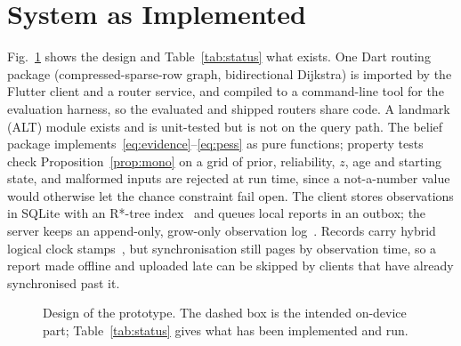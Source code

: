 \documentclass[conference]{IEEEtran}
\begin{document}
\section{System as Implemented}\label{sec:system}
Fig.~\ref{fig:arch} shows the design and Table~\ref{tab:status} what exists. One Dart routing package (compressed-sparse-row graph, bidirectional Dijkstra) is imported by the Flutter client and a router service, and compiled to a command-line tool for the evaluation harness, so the evaluated and shipped routers share code. A landmark (ALT) module exists and is unit-tested but is not on the query path. The belief package implements~\eqref{eq:evidence}--\eqref{eq:pess} as pure functions; property tests check Proposition~\ref{prop:mono} on a grid of prior, reliability, $z$, age and starting state, and malformed inputs are rejected at run time, since a not-a-number value would otherwise let the chance constraint fail open. The client stores observations in SQLite with an R*-tree index~\cite{beckmann1990rstar} and queues local reports in an outbox; the server keeps an append-only, grow-only observation log~\cite{shapiro2011crdt}. Records carry hybrid logical clock stamps~\cite{kulkarni2014hlc}, but synchronisation still pages by observation time, so a report made offline and uploaded late can be skipped by clients that have already synchronised past it.

\begin{figure}[t]
\centering
{}
\caption{Design of the prototype. The dashed box is the intended on-device part; Table~\ref{tab:status} gives what has been implemented and run.}
\label{fig:arch}
\end{figure}
\end{document}
